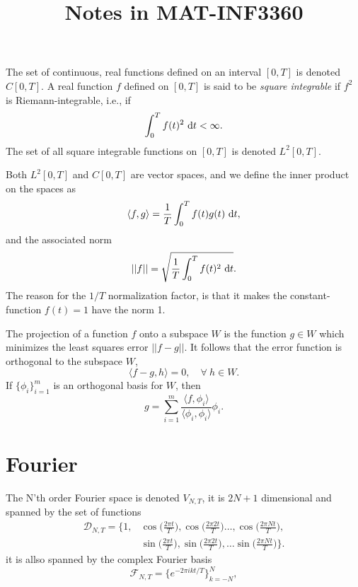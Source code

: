 \documentclass[a4paper, 11pt, notitlepage, english]{article}
\author{}
\title{Notes in MAT-INF3360}
\renewcommand{\d}{{\rm d}}
\newcommand{\inner}[2]{\langle #1 , #2 \rangle}
\begin{document}
The set of continuous, real functions defined on an interval $[0,T]$ is denoted $C[0,T]$. A real function $f$ defined on $[0,T]$ is said to be \emph{square integrable} if $f^2$ is Riemann-integrable, i.e., if
$$\int_0^T f(t)^2 \ \d t < \infty.$$
The set of all square integrable functions on $[0,T]$ is denoted $L^2[0,T]$.

Both $L^2[0,T]$ and $C[0,T]$ are vector spaces, and we define the inner product on the spaces as
$$\inner{f}{g} = \frac{1}{T}\int_0^T f(t)g(t) \ \d t,$$
and the associated norm
$$||f|| = \sqrt{\frac{1}{T} \int_0^T f(t)^2 \ \d t}.$$
The reason for the $1/T$ normalization factor, is that it makes the constant-function $f(t)=1$ have the norm 1.

The projection of a function $f$ onto a subspace $W$ is the function $g\in W$ which minimizes the least squares error $||f-g||$. It follows that the error function is orthogonal to the subspace $W$,
$$\inner{f-g}{h} = 0, \quad \forall \ h \in W.$$
If $\{\phi_i\}_{i=1}^m$ is an orthogonal basis for $W$, then
$$g = \sum_{i=1}^m \frac{\inner{f}{\phi_i}}{\inner{\phi_i}{\phi_i}}\phi_i.$$

\section*{Fourier}
The N'th order Fourier space is denoted $V_{N,T}$, it is $2N+1$ dimensional and spanned by the set of functions
\begin{align*}
\mathcal{D}_{N,T} = \{1, &\cos\bigg(\frac{2\pi t}{T}\bigg), \cos\bigg(\frac{2\pi 2 t}{T}\bigg)\ldots, \cos\bigg(\frac{2\pi Nt}{T}\bigg), \\
&\sin\bigg(\frac{2\pi t}{T}\bigg), \sin\bigg(\frac{2\pi 2t}{T}\bigg), \ldots \sin\bigg(\frac{2\pi Nt}{T}\bigg)\}.
\end{align*}
it is allso spanned by the complex Fourier basis
$$\mathcal{F}_{N,T} = \bigg\{e^{-2\pi i k t/T}\bigg\}_{k=-N}^N,$$
\end{document}
